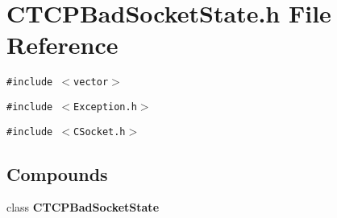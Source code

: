 \section{CTCPBad\-Socket\-State.h File Reference}
\label{CTCPBadSocketState_8h}
{\tt \#include $<$vector$>$}\par
{\tt \#include $<$Exception.h$>$}\par
{\tt \#include $<$CSocket.h$>$}\par
\subsection*{Compounds}
\begin{CompactItemize}
\item 
class {\bf CTCPBad\-Socket\-State}
\end{CompactItemize}
